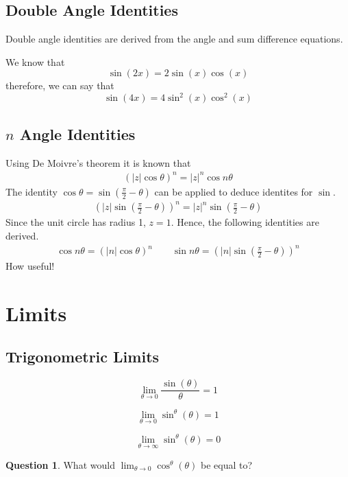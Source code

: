 \documentclass[a4paper]{article}
\theoremstyle{plain}
\theoremstyle{definition}
\newtheorem{question}{Question}[section]
\theoremstyle{remark}
\newcommand{\sectionSpace}{\vspace{2em}} %
\newcommand{\subsectionSpace}{\vspace{0.5em}}
\begin{document}
    \subsection{Double Angle Identities}
    Double angle identities are derived from the angle and sum difference equations. 

    We know that
    $$\sin(2x) = 2\sin(x)\cos(x)$$
    therefore, we can say that
    $$\sin(4x) = 4\sin^2(x)\cos^2(x)$$

    \subsectionSpace
    \subsection{\texorpdfstring{$n$}{n} Angle Identities}
    Using De Moivre's theorem it is known that
    \begin{align}
        (|z|\cos{\theta})^n=|z|^n\cos{n\theta}
    \end{align}
    The identity $\cos{\theta}=\sin{\left(\frac{\pi}{2}-\theta \right)}$ can be applied to deduce identites for $\sin$.
    \begin{align}
        \left(|z|\sin{\left(\frac{\pi}{2}-\theta \right)}\right)^n=|z|^n\sin{\left(\frac{\pi}{2}-\theta \right)}
    \end{align}
    Since the unit circle has radius 1, $z=1$. Hence, the following identities are derived.
    \begin{align}
        \cos{n\theta}=(|n|\cos{\theta})^n\qquad \sin{n\theta}=\left(|n|\sin{\left(\frac{\pi}{2}-\theta \right)}\right)^n
    \end{align}
    How useful!



\sectionSpace
\section{Limits}
    \subsection{Trigonometric Limits}
    $$\lim_{\theta \to 0} \frac{\sin(\theta)}{\theta} = 1$$

    $$\lim_{\theta \to 0} \sin^{\theta}(\theta) = 1$$

    \[\lim_{\theta \to \infty} \sin^{\theta}(\theta) = 0\]

    \begin{question}
        What would $\lim_{\theta \to 0} \cos^{\theta}(\theta)$ be equal to?
    \end{question}
\end{document}

